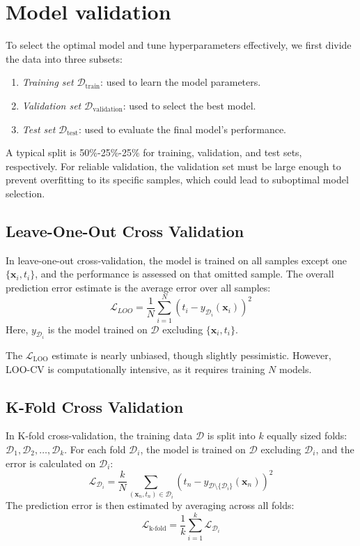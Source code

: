 \section{Model validation}

To select the optimal model and tune hyperparameters effectively, we first divide the data into three subsets:
\begin{enumerate}
    \item \textit{Training set} $\mathcal{D}_{\text{train}}$: used to learn the model parameters.
    \item \textit{Validation set} $\mathcal{D}_{\text{validation}}$: used to select the best model.
    \item \textit{Test set} $\mathcal{D}_{\text{test}}$: used to evaluate the final model's performance.
\end{enumerate}
A typical split is 50\%-25\%-25\% for training, validation, and test sets, respectively. 
For reliable validation, the validation set must be large enough to prevent overfitting to its specific samples, which could lead to suboptimal model selection.

\subsection{Leave-One-Out Cross Validation}
In leave-one-out cross-validation, the model is trained on all samples except one $\{\textbf{x}_i, t_i\}$, and the performance is assessed on that omitted sample. 
The overall prediction error estimate is the average error over all samples:
\[\mathcal{L}_{LOO}=\dfrac{1}{N}\sum_{i=1}^{N}{\left( t_i-y_{\mathcal{D}_i}(\mathbf{x}_i) \right)}^2\]
Here, $y_{\mathcal{D}_i}$ is the model trained on $\mathcal{D}$ excluding $\{\textbf{x}_i, t_i\}$. 

The $\mathcal{L}_{\text{LOO}}$ estimate is nearly unbiased, though slightly pessimistic. 
However, LOO-CV is computationally intensive, as it requires training $N$ models.

\subsection{K-Fold Cross Validation}
In K-fold cross-validation, the training data $\mathcal{D}$ is split into $k$ equally sized folds: $\mathcal{D}_1, \mathcal{D}_2, \dots, \mathcal{D}_k$. 
For each fold $\mathcal{D}_i$, the model is trained on $\mathcal{D}$ excluding $\mathcal{D}_i$, and the error is calculated on $\mathcal{D}_i$:
\[\mathcal{L}_{\mathcal{D}_i}=\dfrac{k}{N}\sum_{(\mathbf{x}_n,t_n) \in \mathcal{D}_i} {\left( t_n-y_{\mathcal{D}\setminus\{\mathcal{D}_i\}}(\mathbf{x}_n) \right)}^2\]
The prediction error is then estimated by averaging across all folds:
\[\mathcal{L}_{\text{k-fold}}=\dfrac{1}{k}\sum_{i=1}^{k}\mathcal{L}_{\mathcal{D}_i}\]

